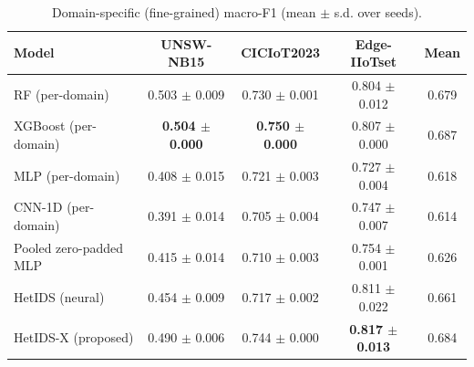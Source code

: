 \begin{table}[htbp]\centering\scriptsize
\caption{Domain-specific (fine-grained) macro-F1 (mean $\pm$ s.d. over seeds).}
\label{tab:fine}
\begin{tabular}{lcccc}
\toprule
Model & UNSW-NB15 & CICIoT2023 & Edge-IIoTset & Mean \\
\midrule
RF (per-domain) & 0.503 $\pm$ 0.009 & 0.730 $\pm$ 0.001 & 0.804 $\pm$ 0.012 & 0.679 \\
XGBoost (per-domain) & \textbf{0.504 $\pm$ 0.000} & \textbf{0.750 $\pm$ 0.000} & 0.807 $\pm$ 0.000 & 0.687 \\
MLP (per-domain) & 0.408 $\pm$ 0.015 & 0.721 $\pm$ 0.003 & 0.727 $\pm$ 0.004 & 0.618 \\
CNN-1D (per-domain) & 0.391 $\pm$ 0.014 & 0.705 $\pm$ 0.004 & 0.747 $\pm$ 0.007 & 0.614 \\
Pooled zero-padded MLP & 0.415 $\pm$ 0.014 & 0.710 $\pm$ 0.003 & 0.754 $\pm$ 0.001 & 0.626 \\
HetIDS (neural) & 0.454 $\pm$ 0.009 & 0.717 $\pm$ 0.002 & 0.811 $\pm$ 0.022 & 0.661 \\
HetIDS-X (proposed) & 0.490 $\pm$ 0.006 & 0.744 $\pm$ 0.000 & \textbf{0.817 $\pm$ 0.013} & 0.684 \\
\bottomrule
\end{tabular}
\end{table}